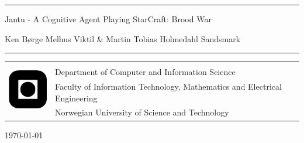 \documentclass[a4paper, twoside, openright, 12pt]{report}
\title{\papertitle}
\author{\authors}
\def \authors {Ken B\o{}rge Melhus Viktil \& Martin Tobias Holmedahl Sandsmark}
\def \papertitle {Jantu - A Cognitive Agent Playing StarCraft: Brood War}
\begin{document}
\begin{titlepage}
\begin{center}

\vspace*{7cm}
\hrule height 1pt
\vspace{.5cm}
\huge{\papertitle}

\vspace{.5cm}
\large{\authors}
\vspace{.5cm}
\hrule height 1pt

\vspace{7cm}
\end{center}
\normalsize
\begin{table}[!h]
\begin{tabular}{ll}
\multirow{4}{*}{\includegraphics[width=20mm]{graphics/logo.png}} & \\
& Department of Computer and Information Science \\
& Faculty of Information Technology, Mathematics and Electrical Engineering \\
& Norwegian University of Science and Technology \\
\end{tabular}
\end{table}
\vspace{.5cm}
\begin{center}
\today
\end{center}
\end{titlepage}

\thispagestyle{empty}
\cleardoublepage

\begin{abstract}
We present our work in implementing a cognitive and volitional agent that plays
the game StarCraft: Brood War.
\end{abstract}
\thispagestyle{empty}
\cleardoublepage


\tableofcontents
\cleardoublepage
\listoffigures
\cleardoublepage
\thispagestyle{empty}
\cleardoublepage

\pagestyle{fancy}







\endrefsection

\cleardoublepage
{}
{}
\printbibliography[segment=0]
\end{document}
